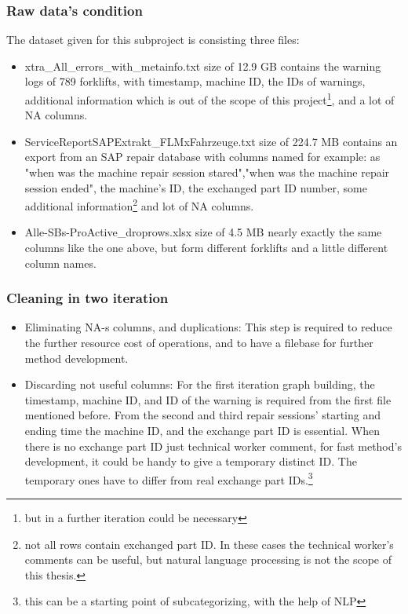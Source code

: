 		\subsubsection{Raw data's condition}
		The dataset given for this subproject is consisting three files:
		\begin{itemize}
			\item{xtra\_All\_errors\_with\_metainfo.txt} size of 12.9 GB contains the warning logs of 789 forklifts, with timestamp, machine ID, the IDs of warnings, additional information which is out of the scope of this project\footnote{but in a further iteration could be necessary}, and a lot of NA columns.
			\item{ServiceReportSAPExtrakt\_FLMxFahrzeuge.txt} size of 224.7 MB contains an export from an SAP repair database with columns named for example: as "when was the machine repair session stared","when was the machine repair session ended", the machine's ID, the exchanged part ID number, some additional information\footnote{not all rows contain exchanged part ID. In these cases the technical worker's comments can be useful, but natural language processing is not the scope of this thesis.} and lot of NA columns.
			\item{Alle-SBs-ProActive\_droprows.xlsx} size of 4.5 MB nearly exactly the same columns like the one above, but form different forklifts and a little different column names.
		\end{itemize}
		\subsubsection{Cleaning in two iteration}
		\begin{itemize}
			\item{Eliminating NA-s columns, and duplications:} This step is required to reduce the further resource cost of operations, and to have a filebase for further method development.
			\item{Discarding not useful columns:} For the first iteration graph building, the timestamp, machine ID, and ID of the warning is required from the first file mentioned before. From the second and third repair sessions' starting and ending time the machine ID, and the exchange part ID is essential. When there is no exchange part ID just technical worker comment, for fast method's development, it could be handy to give a temporary distinct ID. The temporary ones have to differ from real exchange part IDs.\footnote{this can be a starting point of subcategorizing, with the help of NLP} 
		\end{itemize}
